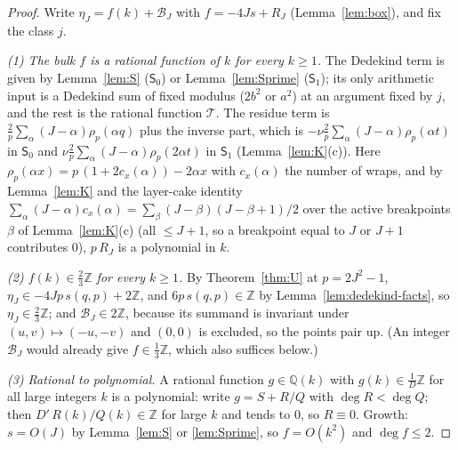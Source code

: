 \documentclass[11pt]{article}
\theoremstyle{definition}
\newcommand{\Z}{\mathbb Z}
\newcommand{\Q}{\mathbb Q}
\begin{document}
\begin{proof}
Write $\eta_J=f(k)+\mathcal B_J$ with $f=-4Js+R_J$ (Lemma~\ref{lem:box}),
and fix the class $j$.

\emph{(1) The bulk $f$ is a rational function of $k$ for every $k\geq1$.}
The Dedekind term is given by Lemma~\ref{lem:S} ($\mathsf S_0$) or
Lemma~\ref{lem:Sprime} ($\mathsf S_1$); its only arithmetic input is a
Dedekind sum of fixed modulus ($2b^2$ or $a^2$) at an argument fixed by
$j$, and the rest is the rational function $\mathcal T$.  The residue
term is $\frac2p\sum_\alpha(J-\alpha)\rho_p(\alpha q)$ plus the inverse
part, which is $-\nu\frac2p\sum_\alpha(J-\alpha)\rho_p(\alpha t)$ in
$\mathsf S_0$ and $\nu\frac2p\sum_\alpha(J-\alpha)\rho_p(2\alpha t)$ in
$\mathsf S_1$ (Lemma~\ref{lem:K}(c)).  Here
$\rho_p(\alpha x)=p\,(1+2c_x(\alpha))-2\alpha x$ with $c_x(\alpha)$ the
number of wraps, and by Lemma~\ref{lem:K} and the layer-cake identity
$\sum_\alpha(J-\alpha)c_x(\alpha)=\sum_{\beta}(J-\beta)(J-\beta+1)/2$
over the active breakpoints $\beta$ of Lemma~\ref{lem:K}(c) (all
$\leq J+1$, so a breakpoint equal to $J$ or $J+1$ contributes $0$),
$p\,R_J$ is a polynomial in $k$.

\emph{(2) $f(k)\in\frac23\Z$ for every $k\geq1$.}  By
Theorem~\ref{thm:U} at $p=2J^2-1$, $\eta_J\in-4Jp\,s(q,p)+2\Z$, and
$6p\,s(q,p)\in\Z$ by Lemma~\ref{lem:dedekind-facts}, so
$\eta_J\in\frac23\Z$; and $\mathcal B_J\in2\Z$, because its summand is
invariant under $(u,v)\mapsto(-u,-v)$ and $(0,0)$ is excluded, so the
points pair up.  (An integer $\mathcal B_J$ would already give
$f\in\frac13\Z$, which also suffices below.)

\emph{(3) Rational to polynomial.}  A rational function
$g\in\Q(k)$ with $g(k)\in\frac1D\Z$ for all large integers $k$ is a
polynomial: write $g=S+R/Q$ with $\deg R<\deg Q$; then
$D'\,R(k)/Q(k)\in\Z$ for large $k$ and tends to $0$, so $R\equiv0$.
Growth: $s=O(J)$ by Lemma~\ref{lem:S} or \ref{lem:Sprime}, so
$f=O(k^2)$ and $\deg f\leq2$.


\end{proof}
\end{document}

